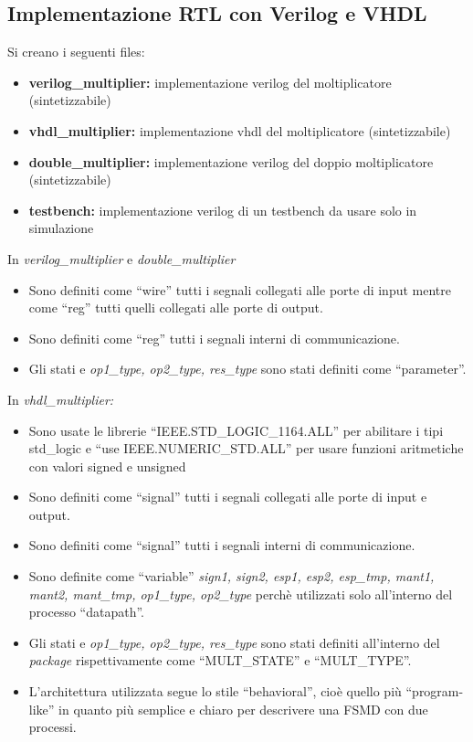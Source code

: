 \documentclass[]{IEEEtran}
\begin{document}
\subsection{Implementazione RTL con Verilog e VHDL}
Si creano i seguenti files:
\begin{itemize}
    \item \textbf{verilog\_multiplier:} implementazione verilog del moltiplicatore (sintetizzabile)
    \item \textbf{vhdl\_multiplier:} implementazione vhdl del moltiplicatore (sintetizzabile)
    \item \textbf{double\_multiplier:} implementazione verilog del doppio moltiplicatore (sintetizzabile)
    \item \textbf{testbench:} implementazione verilog di un testbench da usare solo in simulazione
\end{itemize}
In \textit{verilog\_multiplier} e \textit{double\_multiplier}
\begin{itemize}
    \item Sono definiti come ``wire'' tutti i segnali collegati alle porte di input mentre come ``reg'' tutti quelli collegati alle porte di output.
    \item Sono definiti come ``reg'' tutti i segnali interni di communicazione.
    \item Gli stati e \textit{op1\_type, op2\_type, res\_type} sono stati definiti come ``parameter''.
\end{itemize}
In \textit{vhdl\_multiplier:}
\begin{itemize}
    \item Sono usate le librerie ``IEEE.STD\_LOGIC\_1164.ALL'' per abilitare i tipi std\_logic e ``use IEEE.NUMERIC\_STD.ALL'' per usare funzioni aritmetiche con valori signed e unsigned
    \item Sono definiti come ``signal'' tutti i segnali collegati alle porte di input e output.
    \item Sono definiti come ``signal'' tutti i segnali interni di communicazione.
    \item Sono definite come ``variable'' \textit{sign1, sign2, esp1, esp2, esp\_tmp, mant1, mant2, mant\_tmp, op1\_type, op2\_type} perchè utilizzati solo all'interno del processo ``datapath''.
    \item Gli stati e \textit{op1\_type, op2\_type, res\_type} sono stati definiti all'interno del \textit{package} rispettivamente come ``MULT\_STATE'' e ``MULT\_TYPE''.
    \item L'architettura utilizzata segue lo stile ``behavioral'', cioè quello più ``program-like'' in quanto più semplice e chiaro per descrivere una FSMD con due processi.
\end{itemize}
\end{document}

